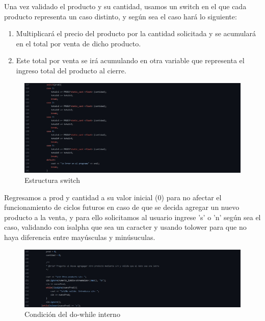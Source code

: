 \documentclass[12pt, letterpaper]{article}
\begin{document}
    \vspace{0.8cm}
    
    Una vez validado el producto y su cantidad, usamos un switch en el que cada producto representa un caso distinto, y según sea el caso hará lo siguiente:
    \begin{enumerate}
       \item Multiplicará el precio del producto por la cantidad solicitada y se acumulará en el total por venta de dicho producto.
       \item Este total por venta se irá acumulando en otra variable que representa el ingreso total del producto al cierre.
    \end{enumerate}
    
    \newpage
    
    \begin{figure}[h]
    \centering
    \includegraphics[width=16cm]{switch.jpg}
    \caption {Estructura switch \label{fig:Fig9}}
    \end{figure}
    
    \vspace{0.8cm}
        
    Regresamos a prod y cantidad a su valor inicial (0) para no afectar el funcionamiento de ciclos futuros en caso de que se decida agregar un nuevo producto a la venta, y para ello solicitamos al usuario ingrese 's' o 'n' según sea el caso, validando con isalpha que sea un caracter y usando tolower para que no haya diferencia entre mayúsculas y minúsuculas. 
    
    \begin{figure}[h]
    \centering
    \includegraphics[width=16cm]{nuevo-prod.jpg}
    \caption {Condición del do-while interno \label{fig:Fig10}}
    \end{figure}
    
\end{document}
